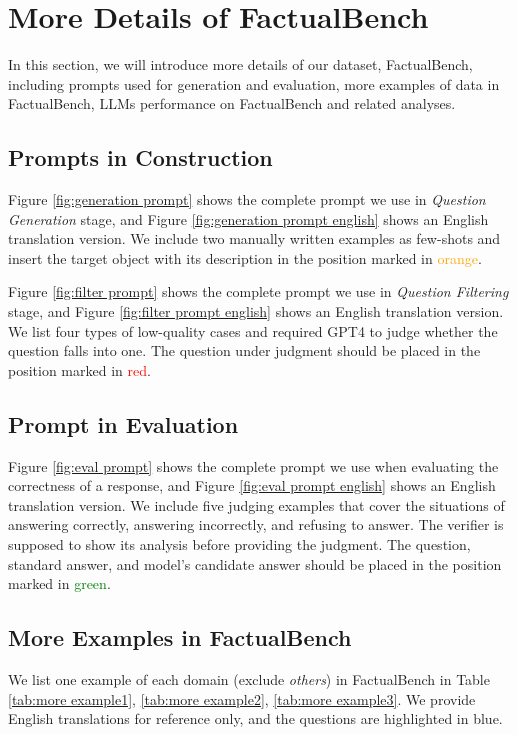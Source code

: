 \newpage

\section{More Details of FactualBench}
In this section, we will introduce more details of our dataset, FactualBench, including prompts used for generation and evaluation, more examples of data in FactualBench, LLMs performance on FactualBench and related analyses.

\subsection{Prompts in Construction}
\label{cha:generation prompts}
Figure \ref{fig:generation prompt} shows the complete prompt we use in \textit{Question Generation} stage, and Figure \ref{fig:generation prompt english} shows an English translation version. We include two manually written examples as few-shots and insert the target object with its description in the position marked in \textcolor{orange}{orange}.

Figure \ref{fig:filter prompt} shows the complete prompt we use in \textit{Question Filtering} stage, and Figure \ref{fig:filter prompt english} shows an English translation version. We list four types of low-quality cases and required GPT4 to judge whether the question falls into one. The question under judgment should be placed in the position marked in \textcolor{red}{red}.

\subsection{Prompt in Evaluation}
\label{cha:evaluation prompts}
Figure \ref{fig:eval prompt} shows the complete prompt we use when evaluating the correctness of a response, and Figure \ref{fig:eval prompt english} shows an English translation version. We include five judging examples that cover the situations of answering correctly, answering incorrectly, and refusing to answer. The verifier is supposed to show its analysis before providing the judgment. The question, standard answer, and model's candidate answer should be placed in the position marked in \textcolor{green}{green}.

\subsection{More Examples in FactualBench}
\label{cha:more examples}
We list one example of each domain (exclude \textit{others}) in FactualBench in Table \ref{tab:more example1}, \ref{tab:more example2}, \ref{tab:more example3}. We provide English translations for reference only, and the questions are highlighted in \textcolor{blue!90}{blue}.

